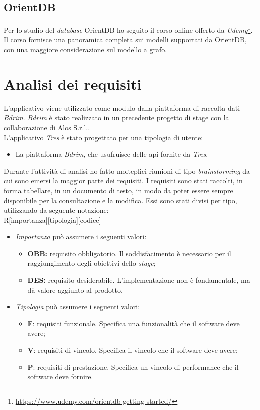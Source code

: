 \subsection*{OrientDB}
Per lo studio del \textit{database} OrientDB ho seguito il corso online offerto da \textit{Udemy}\footnote{\url{https://www.udemy.com/orientdb-getting-started/}}. Il corso fornisce una panoramica completa sui modelli supportati da OrientDB, con una maggiore considerazione sul modello a grafo.

\section{Analisi dei requisiti}
L'applicativo viene utilizzato come modulo dalla piattaforma di raccolta dati \textit{Bdrim}. \textit{Bdrim} è stato realizzato in un precedente progetto di stage con la collaborazione di Alos S.r.l..\\
L'applicativo \textit{Tres} è stato progettato per una tipologia di utente:
\begin{itemize}
	\item La piattaforma \textit{Bdrim}, che usufruisce delle \gls{api} fornite da \textit{Tres}.
\end{itemize}
Durante l'attività di analisi ho fatto molteplici riunioni di tipo \textit{brainstorming} da cui sono emersi la maggior parte dei requisiti. I requisiti sono stati raccolti, in forma tabellare, in un documento di testo, in modo da poter essere sempre disponibile per la consultazione e la modifica. Essi sono stati divisi per tipo, utilizzando da seguente notazione:\\
R[importanza][tipologia][codice]
\begin{itemize}
	\item \textit{Importanza} può assumere i seguenti valori:
	\begin{itemize}
		\item \textbf{OBB:} requisito obbligatorio. Il soddisfacimento è necessario per il raggiungimento degli obiettivi dello \textit{stage};
		\item \textbf{DES:} requisito desiderabile. L'implementazione non è fondamentale, ma dà valore aggiunto al prodotto.
	\end{itemize}
	\item \textit{Tipologia} può assumere i seguenti valori:
	\begin{itemize}
		\item \textbf{F}: requisiti funzionale. Specifica una funzionalità che il software deve avere;
		\item \textbf{V}: requisiti di vincolo. Specifica il vincolo che il software deve avere;
		\item \textbf{P}: requisiti di prestazione. Specifica un vincolo di performance che il software deve fornire. 
	\end{itemize}
\end{itemize}
